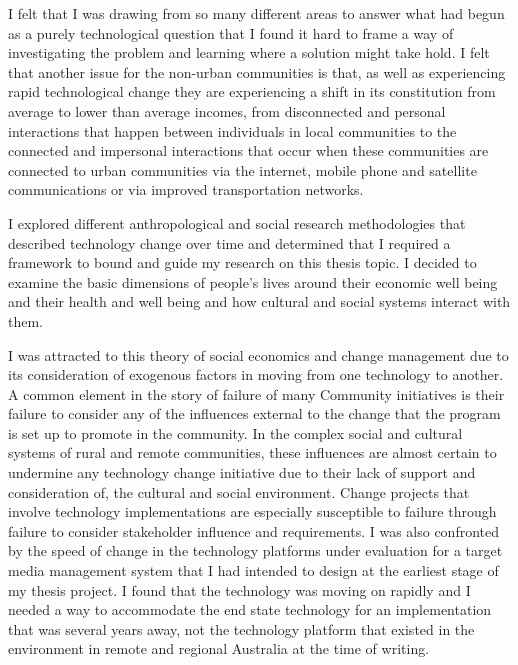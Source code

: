 I felt that I was drawing from so many different areas to answer what had begun as a purely technological question that I found it hard to frame a way of investigating the problem and learning where a solution might take hold. I felt that another issue for the non-urban communities is that, as well as experiencing rapid technological change they are experiencing a shift in its constitution from average to lower than average incomes\cite{RefWorks:424}, from disconnected and personal interactions that happen between individuals in local communities to the connected and impersonal interactions that occur when these communities are connected to urban communities via the internet, mobile phone and satellite communications or via  improved transportation networks. 

I explored different anthropological and social research methodologies that described technology change over time and determined that I required a framework to bound and guide my research on this thesis topic. I decided to examine the basic dimensions of people's lives around their economic well being and their health and well being and how cultural and social systems interact with them.

I was attracted to this theory of social economics and change management due to its consideration of exogenous factors in moving from one technology to another. A common element in the story of failure of many Community initiatives is their failure to consider any of the influences external to the change that the program is set up to promote in the community. In the complex social and cultural systems of rural and remote communities, these influences are almost certain to undermine any technology change initiative due to their lack of support and consideration of, the cultural and social environment. Change projects that involve technology implementations are especially susceptible to failure  through failure to consider stakeholder influence and requirements.\cite[23-24]{RefWorks:115}  I was also confronted by the speed of change in the technology platforms under evaluation for a target media management system that I had intended to design at the earliest stage of my thesis project. I found that the technology was moving on rapidly and I needed a way to accommodate the end state technology for an implementation that was several years away, not the technology platform that existed in the environment in remote and regional Australia at the time of writing.







